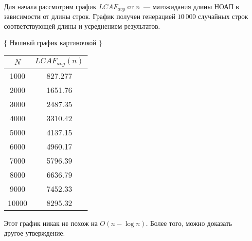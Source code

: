 Для начала рассмотрим график $LCAF_{avg}$ от $n$~--- матожидания длины НОАП в зависимости от длины строк. График получен генерацией $10\,000$ случайных строк соответствующей длины и усреднением результатов.

\{ Няшный график картиночкой \}

\begin{tabular}{|c|c|}
\hline
$N$ & $LCAF_{avg}(n)$ \\
\hline
1000 & 827.277 \\
2000 & 1651.76 \\
3000 & 2487.35 \\
4000 & 3310.42 \\
5000 & 4137.15 \\
6000 & 4960.17 \\
7000 & 5796.39 \\
8000 & 6636.79 \\
9000 & 7452.33 \\
10000 & 8295.32 \\
\hline
\end{tabular}

Этот график никак не похож на $O(n - \log n)$. Более того, можно доказать другое утверждение:

